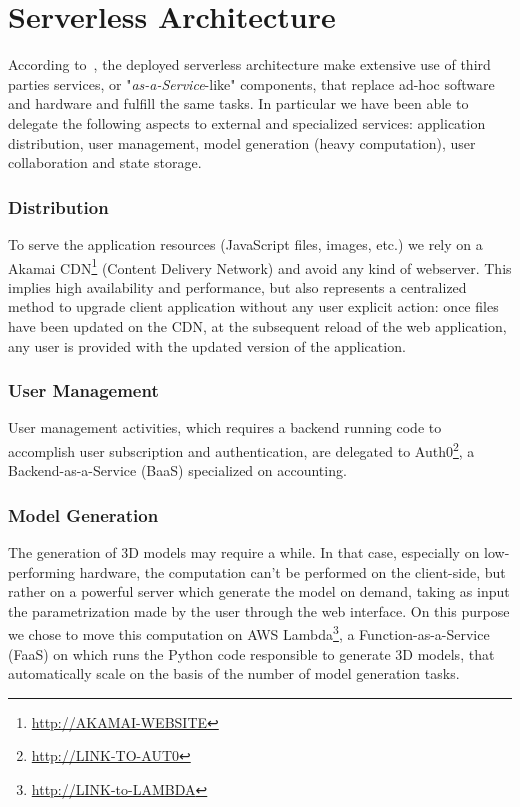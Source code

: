 \section{Serverless Architecture}\label{sec:architecture}

According to~\cite{Roberts}, the deployed serverless architecture make extensive use of third parties services, or "\emph{as-a-Service}-like" components, that replace ad-hoc software and hardware and fulfill the same tasks. In particular we have been able to delegate the following aspects to external and specialized services: application distribution, user management, model generation (heavy computation), user collaboration and state storage.


\subsubsection*{Distribution}

To serve the application resources (JavaScript files, images, etc.) we rely on a Akamai CDN\footnote{\url{http://AKAMAI-WEBSITE}} (Content Delivery Network) and avoid any kind of webserver. This implies high availability and performance, but also represents a centralized method to upgrade client application without any user explicit action: once files have been updated on the CDN, at the subsequent reload of the web application, any user is provided with the updated version of the application.

\subsubsection*{User Management}

User management activities, which requires a backend running code to accomplish user subscription and authentication, are delegated to Auth0\footnote{\url{http://LINK-TO-AUT0}}, a Backend-as-a-Service (BaaS) specialized on accounting.

\subsubsection*{Model Generation}

The generation of 3D models may require a while. In that case, especially on low-performing hardware, the computation can't be performed on the client-side, but rather on a powerful server which generate the model on demand, taking as input the parametrization made by the user through the web interface. On this purpose we chose to move this computation on AWS Lambda\footnote{\url{http://LINK-to-LAMBDA}}, a Function-as-a-Service (FaaS) on which runs the Python code responsible to generate 3D models, that automatically scale on the basis of the number of model generation tasks.

